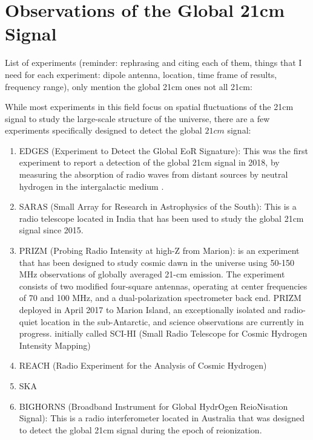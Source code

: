 \documentclass[12pt, TexShade, letterpaper]{report}
\begin{document}
\chapter{Observations of the Global 21cm Signal}
\label{chap:observations}
List of experiments (reminder: rephrasing and citing each of them,  things that I need for each experiment: dipole antenna, location, time frame of results, frequency range), only mention the global 21cm ones not all 21cm:\par
 While most experiments in this field focus on spatial fluctuations of the 21cm signal to study the large-scale structure of the universe, there are a few experiments specifically designed to detect the global $21cm$ signal:
\begin{enumerate}
\item EDGES (Experiment to Detect the Global EoR Signature): This was the first experiment to report a detection of the global 21cm signal in 2018, by measuring the absorption of radio waves from distant sources by neutral hydrogen in the intergalactic medium \cite{edges}.

\item SARAS (Small Array for Research in Astrophysics of the South): This is a radio telescope located in India that has been used to study the global 21cm signal since 2015.

\item PRIZM \cite{prizm_2017} (Probing Radio Intensity at high-Z from Marion): is an experiment that has been designed to study cosmic dawn in the universe using 50-150 MHz observations of globally averaged 21-cm emission. The experiment consists of two modified four-square antennas, operating at center frequencies of 70 and 100 MHz, and a dual-polarization spectrometer back end. PRIZM deployed in April 2017 to Marion Island, an exceptionally isolated and radio-quiet location in the sub-Antarctic, and science observations are currently in progress.
initially called SCI-HI (Small Radio Telescope for Cosmic Hydrogen Intensity Mapping)
\item REACH (Radio Experiment for the Analysis of Cosmic Hydrogen)

\item SKA \cite{SKA_global_21}

\item BIGHORNS (Broadband Instrument for Global HydrOgen ReioNisation Signal): This is a radio interferometer located in Australia that was designed to detect the global 21cm signal during the epoch of reionization.

\end{enumerate}
\end{document}
